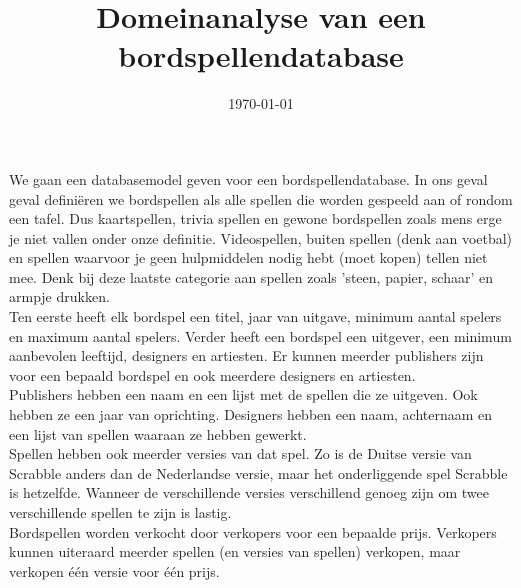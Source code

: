 \documentclass[a4paper, dutch]{scrartcl}
\begin{document}
\title{Domeinanalyse van een bordspellendatabase}
\date{\today}
\maketitle

We gaan een databasemodel geven voor een bordspellendatabase. In ons geval geval definiëren we bordspellen als alle spellen die worden gespeeld aan of rondom een tafel. Dus kaartspellen, trivia spellen en gewone bordspellen zoals mens erge je niet vallen onder onze definitie. Videospellen, buiten spellen (denk aan voetbal) en spellen waarvoor je geen hulpmiddelen nodig hebt (moet kopen) tellen niet mee. Denk bij deze laatste categorie aan spellen zoals 'steen, papier, schaar' en armpje drukken. \\

Ten eerste heeft elk bordspel een titel, jaar van uitgave, minimum aantal spelers en maximum aantal spelers. Verder heeft een bordspel een uitgever, een minimum aanbevolen leeftijd, designers en artiesten. Er kunnen meerder publishers zijn voor een bepaald bordspel en ook meerdere designers en artiesten. \\

Publishers hebben een naam en een lijst met de spellen die ze uitgeven. Ook hebben ze een jaar van oprichting.
Designers hebben een naam, achternaam en een lijst van spellen waaraan ze hebben gewerkt. \\

Spellen hebben ook meerder versies van dat spel. Zo is de Duitse versie van Scrabble anders dan de Nederlandse versie, maar het onderliggende spel Scrabble is hetzelfde. Wanneer de verschillende versies verschillend genoeg zijn om twee verschillende spellen te zijn is lastig. \\

Bordspellen worden verkocht door verkopers voor een bepaalde prijs. Verkopers kunnen uiteraard meerder spellen (en versies van spellen) verkopen, maar verkopen één versie voor één prijs.
\end{document}
